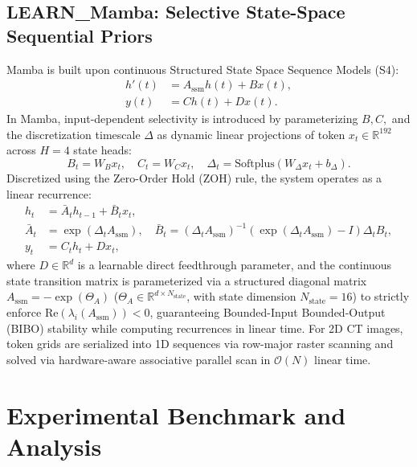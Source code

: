 \documentclass[runningheads]{llncs}
\begin{document}
\subsection{LEARN\_Mamba: Selective State-Space Sequential Priors}
Mamba \cite{gu2023mamba} is built upon continuous Structured State Space Sequence Models (S4):
\begin{align}
h'(t) &= A_{\text{ssm}} h(t) + B x(t), \\
y(t) &= C h(t) + D x(t).
\end{align}
In Mamba, input-dependent selectivity is introduced by parameterizing $B, C,$ and the discretization timescale $\Delta$ as dynamic linear projections of token $x_t \in \mathbb{R}^{192}$ across $H = 4$ state heads:
\begin{equation}
B_t = W_B x_t, \quad C_t = W_C x_t, \quad \Delta_t = \text{Softplus}(W_\Delta x_t + b_\Delta).
\end{equation}
Discretized using the Zero-Order Hold (ZOH) rule, the system operates as a linear recurrence:
\begin{align}
h_t &= \bar{A}_t h_{t-1} + \bar{B}_t x_t, \label{eq:mamba_rec} \\
\bar{A}_t &= \exp(\Delta_t A_{\text{ssm}}), \quad \bar{B}_t = (\Delta_t A_{\text{ssm}})^{-1}(\exp(\Delta_t A_{\text{ssm}}) - I) \Delta_t B_t, \label{eq:mamba_discr} \\
y_t &= C_t h_t + D x_t, \label{eq:mamba_out}
\end{align}
where $D \in \mathbb{R}^{d}$ is a learnable direct feedthrough parameter, and the continuous state transition matrix is parameterized via a structured diagonal matrix $A_{\text{ssm}} = -\exp(\Theta_A)$ ($\Theta_A \in \mathbb{R}^{d \times N_{\text{state}}}$, with state dimension $N_{\text{state}} = 16$) to strictly enforce $\text{Re}(\lambda_i(A_{\text{ssm}})) < 0$, guaranteeing Bounded-Input Bounded-Output (BIBO) stability while computing recurrences in linear time. For 2D CT images, token grids are serialized into 1D sequences via row-major raster scanning and solved via hardware-aware associative parallel scan in $\mathcal{O}(N)$ linear time.

\section{Experimental Benchmark and Analysis}
\label{sec:experiments}
\end{document}
